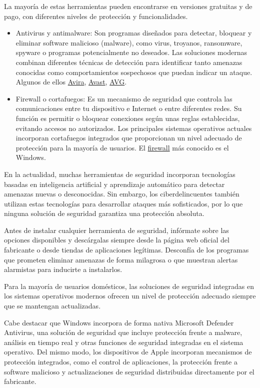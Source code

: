 \documentclass[
  spanish,
  a4paper,
  openany]{book}
\begin{document}
La mayoría de estas herramientas pueden encontrarse en versiones gratuitas y de pago, con diferentes niveles de protección y funcionalidades.

\begin{itemize}
\item
  Antivirus y antimalware: Son programas diseñados para detectar, bloquear y eliminar software malicioso (malware), como virus, troyanos, ransomware, spyware o programas potencialmente no deseados. Las soluciones modernas combinan diferentes técnicas de detección para identificar tanto amenazas conocidas como comportamientos sospechosos que puedan indicar un ataque. Algunos de ellos \href{https://www.avira.com/es}{Avira}, \href{https://www.avast.com/es-es/index\#pc}{Avast}, \href{https://www.avg.com/es-es/homepage\#pc}{AVG}.
\item
  Firewall o cortafuegos: Es un mecanismo de seguridad que controla las comunicaciones entre tu dispositivo e Internet o entre diferentes redes. Su función es permitir o bloquear conexiones según unas reglas establecidas, evitando accesos no autorizados. Los principales sistemas operativos actuales incorporan cortafuegos integrados que proporcionan un nivel adecuado de protección para la mayoría de usuarios. El \href{https://en.wikipedia.org/wiki/Windows_Firewall}{firewall} más conocido es el Windows.
\end{itemize}

En la actualidad, muchas herramientas de seguridad incorporan tecnologías basadas en inteligencia artificial y aprendizaje automático para detectar amenazas nuevas o desconocidas. Sin embargo, los ciberdelincuentes también utilizan estas tecnologías para desarrollar ataques más sofisticados, por lo que ninguna solución de seguridad garantiza una protección absoluta.

Antes de instalar cualquier herramienta de seguridad, infórmate sobre las opciones disponibles y descárgalas siempre desde la página web oficial del fabricante o desde tiendas de aplicaciones legítimas. Desconfía de los programas que prometen eliminar amenazas de forma milagrosa o que muestran alertas alarmistas para inducirte a instalarlos.

Para la mayoría de usuarios domésticos, las soluciones de seguridad integradas en los sistemas operativos modernos ofrecen un nivel de protección adecuado siempre que se mantengan actualizadas.

Cabe destacar que Windows incorpora de forma nativa Microsoft Defender Antivirus, una solución de seguridad que incluye protección frente a malware, análisis en tiempo real y otras funciones de seguridad integradas en el sistema operativo. Del mismo modo, los dispositivos de Apple incorporan mecanismos de protección integrados, como el control de aplicaciones, la protección frente a software malicioso y actualizaciones de seguridad distribuidas directamente por el fabricante.
\end{document}
